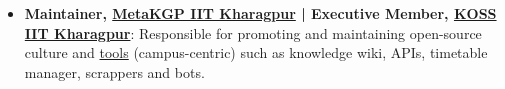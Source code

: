 \documentclass[a4paper,10pt]{extarticle} %
\begin{document}
\begin{itemize}[leftmargin=0.55cm, rightmargin=0.2cm, label={\Large\textbullet}]



\item \textbf{Maintainer, \href{https://wiki.metakgp.org/w/Metakgp:About}{MetaKGP IIT Kharagpur} | Executive Member, \href{https://kossiitkgp.org/about/index.html}{KOSS IIT Kharagpur}}: Responsible for promoting and maintaining open-source culture and \href{https://github.com/metakgp/}{tools} (campus-centric) such as knowledge wiki, APIs, timetable manager, scrappers and bots.
\end{itemize}




\end{document}
